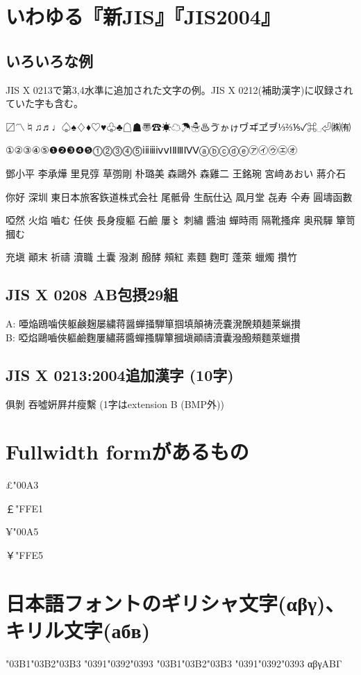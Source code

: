 \documentclass[landscape]{utarticle}
\begin{document}
\section{いわゆる『新JIS』『JIS2004』}
\subsection{いろいろな例}
JIS X 0213で第3,4水準に追加された文字の例。JIS X 0212(補助漢字)に収録されていた字も含む。

〼〽♮♫♬♩♤♠♢♦♡♥♧♣☖☗〠☎☀☁☂☃♨ゔゕゖヷヸヹヺ⅓⅔⅕✓⌘␣⏎㈱㈲

①②③④⑤❶❷❸❹❺⓵⓶⓷⓸⓹ⅰⅱⅲⅳⅴⅠⅡⅢⅣⅤⓐⓑⓒⓓⓔ㋐㋑㋒㋓㋔

鄧小平 李承燁 里見弴 草彅剛 朴璐美 森鷗外 森雞二 王銘琬 宮﨑あおい 蔣介石

你好 深圳 東日本旅客鉃道株式会社 尾骶骨 生酛仕込 凮月堂 㐂寿 仐寿 圓壔函數

啞然 火焰 嚙む 任俠 長身瘦軀 石鹼 屢〻 刺繡 醬油 蟬時雨 隔靴搔痒 奥飛驒 簞笥 摑む

充塡 顚末 祈禱 瀆職 土囊 潑溂 醱酵 頰紅 素麵 麴町 蓬萊 蠟燭 攢竹

\subsection{JIS X 0208 AB包摂29組}
{\gt
\noindent
A: 唖焔鴎噛侠躯鹸麹屡繍蒋醤蝉掻騨箪掴填顛祷涜嚢溌醗頬麺莱蝋攅\\
B: 啞焰鷗嚙俠軀鹼麴屢繡蔣醬蟬搔驒簞摑塡顚禱瀆囊潑醱頰麵萊蠟攢
}

\subsection{JIS X 0213:2004追加漢字 (10字)}
\noindent
俱剝%
吞噓姸屛幷瘦繫 (1字はextension B (BMP外))

\section{Fullwidth formがあるもの}
£\kchar\ucs"00A3%

￡\kchar\ucs"FFE1%

¥\kchar\ucs"00A5%

￥\kchar\ucs"FFE5%


\section{日本語フォントのギリシャ文字(αβγ)、キリル文字(абв)}
\char\ucs"03B1\char\ucs"03B2\char\ucs"03B3
\char\ucs"0391\char\ucs"0392\char\ucs"0393
\quad
\char"03B1\char"03B2\char"03B3
\char"0391\char"0392\char"0393
\quad
αβγΑΒΓ
\end{document}
